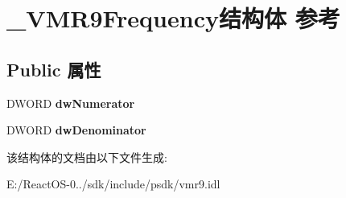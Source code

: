 \hypertarget{struct___v_m_r9_frequency}{}\section{\+\_\+\+V\+M\+R9\+Frequency结构体 参考}
\label{struct___v_m_r9_frequency}
\subsection*{Public 属性}
\begin{DoxyCompactItemize}
\item 
\mbox{\label{struct___v_m_r9_frequency_a9b8b5ade9a0476cbd92d0925fe33b161}} 
D\+W\+O\+RD {\bfseries dw\+Numerator}
\item 
\mbox{\label{struct___v_m_r9_frequency_a39c7337224c2f95d5922d1dd261cd65b}} 
D\+W\+O\+RD {\bfseries dw\+Denominator}
\end{DoxyCompactItemize}


该结构体的文档由以下文件生成\+:\begin{DoxyCompactItemize}
\item 
E\+:/\+React\+O\+S-\/0../sdk/include/psdk/vmr9.\+idl\end{DoxyCompactItemize}
